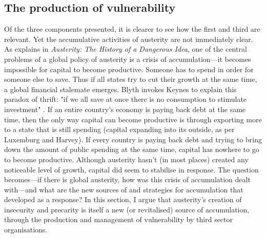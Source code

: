 \subsection{The production of vulnerability}
\label{subsec:the-production-of-vulnerability}

Of the three components presented, it is clearer to see how the first and third are relevant. Yet the accumulative activities of austerity are not immediately clear. As \citet{blyth_austerity_2013} explains in \emph{Austerity: The History of a Dangerous Idea}, one of the central problems of a global policy of austerity is a crisis of accumulation—it becomes impossible for capital to become productive. Someone has to spend in order for someone else to save. Thus if all states try to cut their growth at the same time,  a global financial stalemate emerges. Blyth invokes Keynes to explain this paradox of thrift: "if we all save at once there is no consumption to stimulate investment" \citep[p. 8]{blyth_austerity_2013}. If an entire country's economy is paying back debt at the same time, then the only way capital can become productive is through exporting more to a state that is still spending (capital expanding into its outside, as per Luxemburg and Harvey). If every country is paying back debt and trying to bring down the amount of public spending at the same time, capital has nowhere to go to become productive. Although austerity hasn't (in most places) created any noticeable level of growth, capital did seem to stabilise in response. The question becomes—if there is global austerity, how was this crisis of accumulation dealt with—and what are the new sources of and strategies for accumulation that developed as a response? In this section, I argue that austerity's creation of insecurity and precarity is itself a new (or revitalised) source of accumulation, through the production and management of vulnerability by third sector organisations. 

